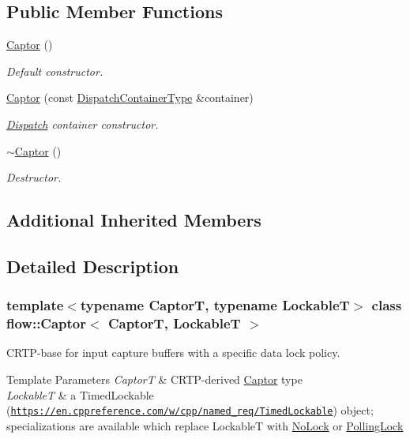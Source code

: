 \subsection*{Public Member Functions}
\begin{DoxyCompactItemize}
\item 
\mbox{\label{classflow_1_1_captor_ac9f335ac230ebeec7690359f2c3d331f}} 
\hyperlink{classflow_1_1_captor_ac9f335ac230ebeec7690359f2c3d331f}{Captor} ()
\begin{DoxyCompactList}\small\item\em Default constructor. \end{DoxyCompactList}\item 
\hyperlink{classflow_1_1_captor_a61bbbe60527baf460e8359a67910c277}{Captor} (const \hyperlink{classflow_1_1_captor_a9f10a93138e8a967a14e7c74215f22f8}{Dispatch\+Container\+Type} \&container)
\begin{DoxyCompactList}\small\item\em \hyperlink{classflow_1_1_dispatch}{Dispatch} container constructor. \end{DoxyCompactList}\item 
\hyperlink{classflow_1_1_captor_ac033d71daa64b6b7cd54a2351a37cd3c}{$\sim$\+Captor} ()
\begin{DoxyCompactList}\small\item\em Destructor. \end{DoxyCompactList}\end{DoxyCompactItemize}
\subsection*{Additional Inherited Members}


\subsection{Detailed Description}
\subsubsection*{template$<$typename CaptorT, typename LockableT$>$\newline
class flow\+::\+Captor$<$ Captor\+T, Lockable\+T $>$}

C\+R\+T\+P-\/base for input capture buffers with a specific data lock policy. 


\begin{DoxyTemplParams}{Template Parameters}
{\em CaptorT} & C\+R\+T\+P-\/derived \hyperlink{classflow_1_1_captor}{Captor} type \\
\hline
{\em LockableT} & a Timed\+Lockable (\href{https://en.cppreference.com/w/cpp/named_req/TimedLockable}{\tt https\+://en.\+cppreference.\+com/w/cpp/named\+\_\+req/\+Timed\+Lockable}) object; specializations are available which replace {\ttfamily LockableT} with {\ttfamily \hyperlink{structflow_1_1_no_lock}{No\+Lock}} or {\ttfamily \hyperlink{structflow_1_1_polling_lock}{Polling\+Lock}} \\
\hline
\end{DoxyTemplParams}



